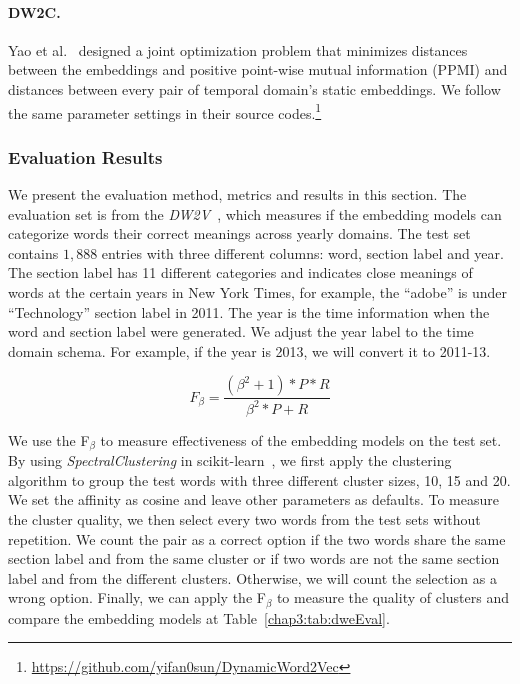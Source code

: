 \paragraph{DW2C.} 
Yao et al.~\cite{yao2018dynamic} designed a joint optimization problem that minimizes distances between the embeddings and positive point-wise mutual information (PPMI) and distances between every pair of temporal domain's static embeddings. We follow the same parameter settings in their source codes.\footnote{\url{https://github.com/yifan0sun/DynamicWord2Vec}}

\subsubsection{Evaluation Results}
We present the evaluation method, metrics and results in this section.
The evaluation set is from the \textit{DW2V}~\cite{yao2018dynamic}, which measures if the embedding models can categorize words their correct meanings across yearly domains. 
The test set contains $1,888$ entries with three different columns: word, section label and year.
The section label has 11 different categories and indicates close meanings of words at the certain years in New York Times, for example, the ``adobe'' is under ``Technology'' section label in 2011.
The year is the time information when the word and section label were generated.
We adjust the year label to the time domain schema.
For example, if the year is 2013, we will convert it to 2011-13.

$$F_\beta = \frac{(\beta^2 + 1) * P * R}{\beta^2*P + R}$$

We use the F$_\beta$ to measure effectiveness of the embedding models on the test set.
By using \textit{SpectralClustering} in scikit-learn~\cite{pedregosa2011scikit}, we first apply the clustering algorithm to group the test words with three different cluster sizes, 10, 15 and 20. 
We set the affinity as cosine and leave other parameters as defaults.
To measure the cluster quality, we then select every two words from the test sets without repetition.
We count the pair as a correct option if the two words share the same section label and from the same cluster or if two words are not the same section label and from the different clusters.
Otherwise, we will count the selection as a wrong option.
Finally, we can apply the F$_\beta$ to measure the quality of clusters and compare the embedding models at Table~\ref{chap3:tab:dweEval}.

